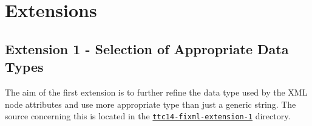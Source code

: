 
\section{Extensions}
\label{sec:Extensions}

\subsection{Extension 1 - Selection of Appropriate Data Types}
\label{sec:Extension1}

The aim of the first extension is to further refine the data type used by the XML node attributes and use more appropriate type than just a generic string.
The source concerning this is located in the \href{https://github.com/fikovnik/ttc14-fixml-sigma/tree/master/ttc14-fixml-extension-1}{\texttt{ttc14-fixml-extension-1}} directory.

